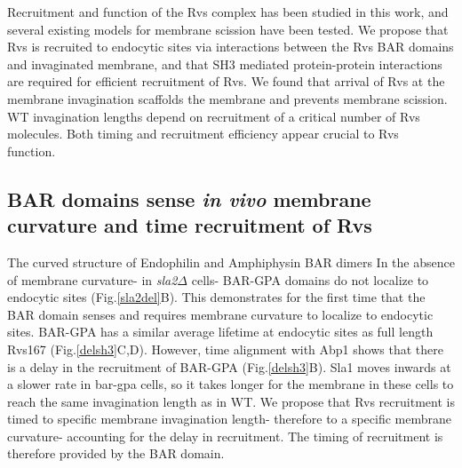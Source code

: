 \documentclass[9pt,lineno]{elife}
\begin{document}
Recruitment and function of the Rvs complex has been studied in this work, and several existing models for membrane scission have been tested. We propose that Rvs is recruited to endocytic sites via interactions between the Rvs BAR domains and invaginated membrane, and that SH3 mediated protein-protein interactions are required for efficient recruitment of Rvs. We found that arrival of Rvs at the membrane invagination scaffolds the membrane and prevents membrane scission. WT invagination lengths depend on recruitment of a critical number of Rvs molecules. Both timing and recruitment efficiency appear crucial to Rvs function. 

\subsection{BAR domains sense \textit{in vivo} membrane curvature and time recruitment of Rvs}

The curved structure of Endophilin and Amphiphysin BAR dimers  \cite{Peters2004,Mim2012} In the absence of membrane curvature- in \textit{sla2$\Delta$} cells- BAR-GPA domains do not localize to endocytic sites (Fig.\ref{sla2del}B). This demonstrates for the first time that the BAR domain senses and requires membrane curvature to localize to endocytic sites. BAR-GPA has a similar average lifetime at endocytic sites as full length Rvs167 (Fig.\ref{delsh3}C,D). However, time alignment with Abp1 shows that there is a delay in the recruitment of BAR-GPA (Fig.\ref{delsh3}B). Sla1 moves inwards at a slower rate in bar-gpa cells, so it takes longer for the membrane in these cells to reach the same invagination length as in WT. We propose that Rvs recruitment is timed to specific membrane invagination length- therefore to a specific membrane curvature- accounting for the delay in recruitment. The timing of recruitment is therefore provided by the BAR domain.  
\end{document}

